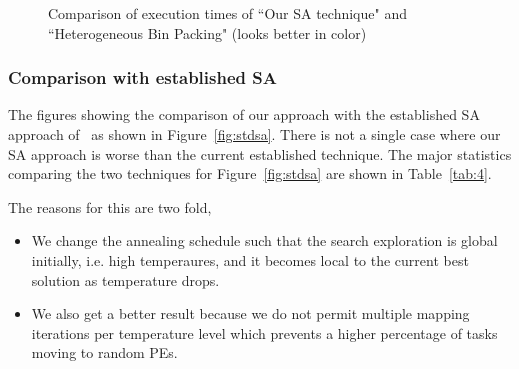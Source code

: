 \begin{figure}[t!]
{    \label{fig:gram1ho}
  }
  \caption{Comparison of execution times of ``Our SA technique" and
    ``Heterogeneous Bin Packing" (looks better in color)}
  \label{fig:ho}
\end{figure}


\subsubsection{Comparison with established SA}
\label{sec:comp-with-establ}

The figures showing the comparison of our approach with the established
SA approach of~\cite{hors06} as shown in Figure~\ref{fig:stdsa}. There
is not a single case where our SA approach is worse than the current
established technique. The major statistics comparing the two techniques
for Figure~\ref{fig:stdsa} are shown in Table~\ref{tab:4}.

The reasons for this are two fold,
\begin{itemize}
\item We change the annealing schedule such that the search exploration is
global initially, i.e. high temperaures, and it becomes local to the current
best solution as temperature drops.
\item We also get a better result because we do not permit multiple mapping
iterations per temperature level which prevents a higher percentage of tasks
moving to random PEs. 
\end{itemize}

